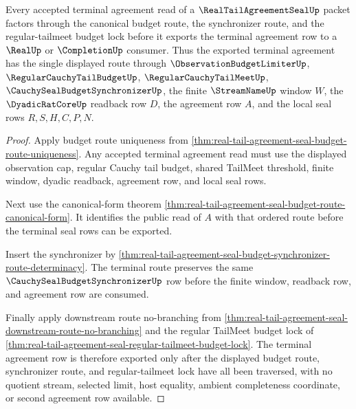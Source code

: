 \begin{theorem}
\label{thm:real-tail-agreement-seal-budget-route-factorization}
Every accepted terminal agreement read of a $\RealTailAgreementSealUp$ packet factors through the canonical budget route, the synchronizer route, and the regular-tailmeet budget lock before it exports the terminal agreement row to a $\RealUp$ or $\CompletionUp$ consumer. Thus the exported terminal agreement has the single displayed route through $\ObservationBudgetLimiterUp$, $\RegularCauchyTailBudgetUp$, $\RegularCauchyTailMeetUp$, $\CauchySealBudgetSynchronizerUp$, the finite $\StreamNameUp$ window $W$, the $\DyadicRatCoreUp$ readback row $D$, the agreement row $A$, and the local seal rows $R,S,H,C,P,N$.
\end{theorem}
\begin{proof}
Apply budget route uniqueness from \autoref{thm:real-tail-agreement-seal-budget-route-uniqueness}. Any accepted terminal agreement read must use the displayed observation cap, regular Cauchy tail budget, shared TailMeet threshold, finite window, dyadic readback, agreement row, and local seal rows.

Next use the canonical-form theorem \autoref{thm:real-tail-agreement-seal-budget-route-canonical-form}. It identifies the public read of $A$ with that ordered route before the terminal seal rows can be exported.

Insert the synchronizer by \autoref{thm:real-tail-agreement-seal-budget-synchronizer-route-determinacy}. The terminal route preserves the same $\CauchySealBudgetSynchronizerUp$ row before the finite window, readback row, and agreement row are consumed.

Finally apply downstream route no-branching from \autoref{thm:real-tail-agreement-seal-downstream-route-no-branching} and the regular TailMeet budget lock of \autoref{thm:real-tail-agreement-seal-regular-tailmeet-budget-lock}. The terminal agreement row is therefore exported only after the displayed budget route, synchronizer route, and regular-tailmeet lock have all been traversed, with no quotient stream, selected limit, host equality, ambient completeness coordinate, or second agreement row available.
\end{proof}

